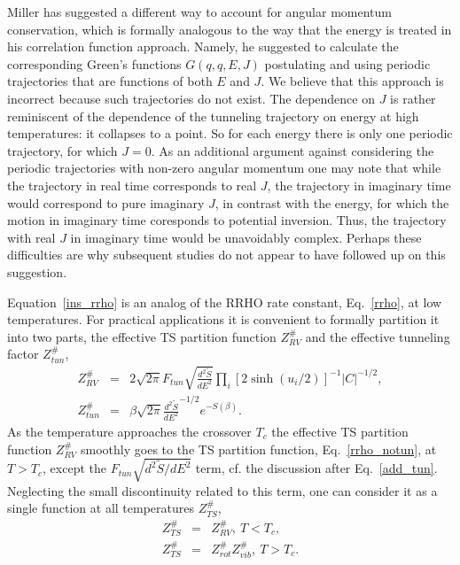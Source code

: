 \documentclass[journal=jpcafh,manuscript=article]{achemso}
\begin{document}
Miller\cite{miller75} has suggested a different way to account for
angular momentum conservation, which is formally analogous to the way
that the energy is treated in his correlation function
approach. Namely, he suggested to calculate the corresponding Green's
functions $G(q, q, E, J)$ postulating and using periodic trajectories
that are functions of both $E$ and $J$. We believe that this approach is
incorrect because such trajectories do not exist.  The dependence on
$J$ is rather reminiscent of the dependence of the tunneling
trajectory on energy at high temperatures: it collapses to a point. So
for each energy there is only one periodic trajectory, for which
$J=0$. As an additional argument against considering the periodic
trajectories with non-zero angular momentum one may note that while
the trajectory in real time corresponds to real $J$, the trajectory in
imaginary time would correspond to pure imaginary $J$, in contrast
with the energy, for which the motion in imaginary time coresponds to
potential inversion. Thus, the trajectory with real $J$ in imaginary
time would be unavoidably complex. Perhaps these difficulties are why
subsequent studies do not appear to have followed up on this
suggestion.

Equation~\ref{ins_rrho} is an analog of the RRHO rate constant,
Eq.~\ref{rrho}, at low temperatures. For practical applications it is
convenient to formally partition it into two parts, the effective TS
partition function $Z^\#_{RV}$ and the effective tunneling factor
$Z^\#_{tun}$,
\begin{eqnarray}
  \label{rv_pf}
  Z^\#_{RV}&=&2\sqrt{2\pi}F_{tun}\sqrt{\frac{d^2\tilde{S}}{dE^2}}\prod_i[2\sinh(u_i/2)]^{-1}|C|^{-1/2},
  \\
  \label{ins_tun_pf}
  Z^\#_{tun}&=&\beta\sqrt{2\pi}\frac{d^2\tilde{S}}{dE^2}^{-1/2}e^{-S(\beta)}.
\end{eqnarray}
As the temperature approaches the crossover $T_c$ the effective TS
partition function $Z^\#_{RV}$ smoothly goes to the TS partition
function, Eq.~\ref{rrho_notun}, at $T>T_c$, except the
$F_{tun}\sqrt{d^2\tilde{S}/{dE}^2}$ term, cf. the discussion after
Eq.~\ref{add_tun}. Neglecting the small discontinuity related to this
term, one can consider it as a single function at all temperatures
$Z^\#_{TS}$,
\begin{eqnarray}
  \label{uni_pf}
  Z^\#_{TS}&=&Z^\#_{RV},\ T<T_c,
  \\
  \nonumber
  Z^\#_{TS}&=&Z^\#_{rot}Z^\#_{vib},\ T>T_c.
\end{eqnarray}
\end{document}
